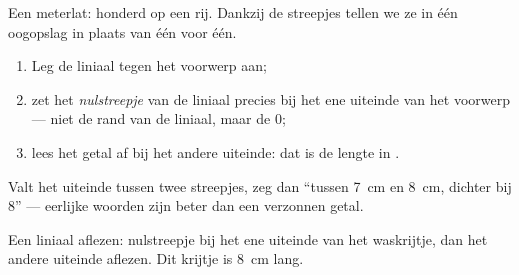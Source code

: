 \begin{omfigure}

{\small Een meterlat: honderd  op een rij. Dankzij de
streepjes tellen we ze in één oogopslag in plaats van één voor één.}
\end{omfigure}

\begin{method}\label{met:g2:measuring-length:ruler}
\begin{enumerate}
  \item Leg de liniaal tegen het voorwerp aan;
  \item zet het \emph{nulstreepje} van de liniaal precies bij het ene
        uiteinde van het voorwerp --- niet de rand van de liniaal,
        maar de $0$;
  \item lees het getal af bij het andere uiteinde: dat is de lengte in
        .
\end{enumerate}
Valt het uiteinde tussen twee streepjes, zeg dan ``tussen \qty{7}{cm}
en \qty{8}{cm}, dichter bij $8$'' --- eerlijke woorden zijn beter dan
een verzonnen getal.
\end{method}

\begin{omfigure}

{\small Een liniaal aflezen: nulstreepje bij het ene uiteinde van het
waskrijtje, dan het andere uiteinde aflezen. Dit krijtje is
\qty{8}{cm} lang.}
\end{omfigure}

